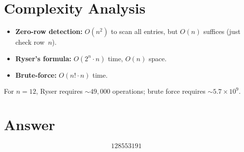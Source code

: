 \documentclass[11pt]{article}
\begin{document}
\section{Complexity Analysis}

\begin{itemize}
\item \textbf{Zero-row detection:} $O(n^2)$ to scan all entries, but $O(n)$ suffices (just check row~$n$).
\item \textbf{Ryser's formula:} $O(2^n \cdot n)$ time, $O(n)$ space.
\item \textbf{Brute-force:} $O(n! \cdot n)$ time.
\end{itemize}

For $n = 12$, Ryser requires $\sim 49{,}000$ operations; brute force requires $\sim 5.7 \times 10^9$.

\section{Answer}

\[
\boxed{128553191}
\]
\end{document}
